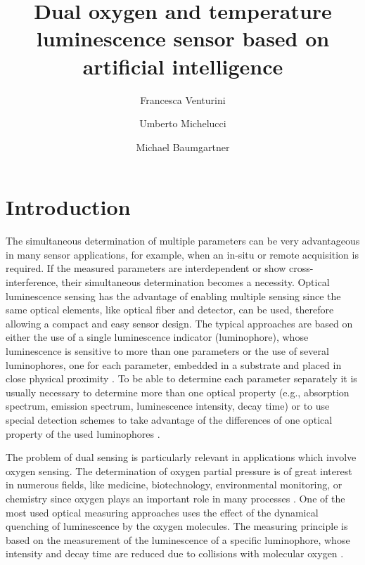 \documentclass[9pt,twocolumn,twoside,pdftex]{optica}
\title{Dual oxygen and temperature luminescence sensor based on artificial intelligence}
\author[1,2,*]{Francesca Venturini}
\author[2]{Umberto Michelucci}
\author[1]{Michael Baumgartner}
\affil[1]{Institute of Applied Mathematics and Physics, Zurich University of Applied Sciences,
Technikumstrasse 9, 8401 Winterthur, Switzerland}
\affil[2]{TOELT LLC; Birchlenstr. 25, 8600 Dübendorf, Switzerland}
\affil[*]{Corresponding author: francesca.venturini@zhaw.ch}
\begin{document}
\maketitle

\section{Introduction}

The simultaneous determination of multiple parameters can be very advantageous in many sensor applications, for example, when an in-situ or remote acquisition is required. If the measured parameters are interdependent or show cross-interference, their simultaneous determination becomes a necessity. Optical luminescence sensing has the advantage of enabling multiple sensing since the same optical elements, like optical fiber and detector, can be used, therefore allowing a compact and easy sensor design. The typical approaches are based on either the use of a single luminescence indicator (luminophore), whose luminescence is sensitive to more than one parameters or the use of several luminophores, one for each parameter, embedded in a substrate and placed in close physical proximity \cite{Stich2010,Borisov2011novel,Kameya2014,Wang2014,Santoro2016,Biring2019}. To be able to determine each parameter separately it is usually necessary to determine more than one optical property (e.g., absorption spectrum, emission spectrum, luminescence intensity, decay time) or to use special detection schemes to take advantage of the differences of one optical property of the used luminophores \cite{Collier2013,Wang2014}. 

The problem of dual sensing is particularly relevant in applications which involve oxygen sensing. The determination of oxygen partial pressure is of great interest in numerous fields, like medicine, biotechnology, environmental monitoring, or chemistry since oxygen plays an important role in many processes \cite{Papkovsky2013,Wang2014}. One of the most used optical measuring approaches uses the effect of the dynamical quenching of luminescence by the oxygen molecules. The measuring principle is based on the measurement of the luminescence of a specific luminophore, whose intensity and decay time are reduced due to collisions with molecular oxygen \cite{Lakowicz2006}.
\end{document}
